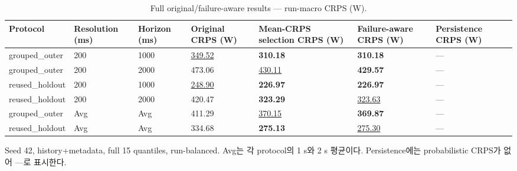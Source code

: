 \begin{table}[t]
\centering
\caption{Full original/failure-aware results — run-macro CRPS (W).}
\label{tab:a2d_failure_aware_crps}
\small
\begin{tabular}{lllllll}
\toprule
Protocol & Resolution (ms) & Horizon (ms) & Original CRPS (W) & Mean-CRPS selection CRPS (W) & Failure-aware CRPS (W) & Persistence CRPS (W) \\
\midrule
grouped\_outer & 200 & 1000 & \underline{349.52} & \textbf{310.18} & \textbf{310.18} & --- \\
grouped\_outer & 200 & 2000 & 473.06 & \underline{430.11} & \textbf{429.57} & --- \\
reused\_holdout & 200 & 1000 & \underline{248.90} & \textbf{226.97} & \textbf{226.97} & --- \\
reused\_holdout & 200 & 2000 & 420.47 & \textbf{323.29} & \underline{323.63} & --- \\
grouped\_outer & Avg & Avg & 411.29 & \underline{370.15} & \textbf{369.87} & --- \\
reused\_holdout & Avg & Avg & 334.68 & \textbf{275.13} & \underline{275.30} & --- \\
\bottomrule
\end{tabular}
\vspace{2pt}\par\footnotesize Seed 42, history+metadata, full 15 quantiles, run-balanced. Avg는 각 protocol의 1 s와 2 s 평균이다. Persistence에는 probabilistic CRPS가 없어 —로 표시한다.
\end{table}

